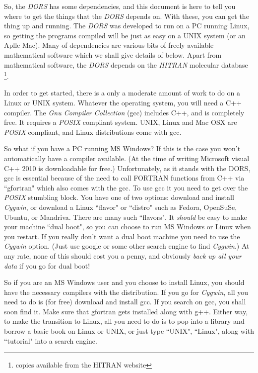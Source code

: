 \documentclass[12pt]{article}
\begin{document}
 So, the {\it DORS} has some dependencies, and this document is here to tell you
where to get the things that the {\it DORS} depends on. With these, you can get the thing up and running.
The {\it DORS} was developed to run on a PC running Linux, so getting the programs compiled
will be just as easy on a UNIX system (or an Aplle Mac). Many of  dependencies are  various bits of freely
available mathematical software which we shall give details of below. Apart from mathematical
software, the {\it DORS}
 depends on the {\it HITRAN}
molecular database \cite{RothmanETAL:Mybib} \cite{RothmanETAL96:Mybib} \cite{RothmanETAL08:Mybib} \footnote{copies available from the HITRAN website}.

 In order to get started, there is a only a moderate
amount of work to do on a Linux or UNIX system. Whatever the operating system, you will need a C++ compiler.
The {\it Gnu Compiler Collection} (gcc) includes C++, and is  completely free. It requires a {\it POSIX} compliant system. UNIX, 
Linux and Mac OSX are { \it POSIX }compliant, and Linux distributions come with gcc. 

 So what if you have
a PC running MS Windows? 
If this is the
case you won't automatically have a compiler available. (At the time of writing Microsoft visual C++ 2010 is
 downloadable for free.) Unfortunately, as it stands with the DORS, gcc is essential because of the need to
call FORTRAN functions from C++ via ``gfortran" which also comes with the gcc. To use gcc it you need 
to get over the {\it POSIX} stumbling block. 
You have one of two options: download and install {\it Cygwin}, or download a Linux ``flavor" or ``distro" 
 such as Fedora, OpenSuSe, Ubuntu, or Mandriva. There are many such ``flavors". It {\it should} be easy to make
your machine ``dual boot", so you can choose to run MS Windows or Linux when you restart.
If you  really don't want a dual boot machine you need to use the {\it Cygwin} option. (Just use google or some other search engine
to find {\it Cygwin}.) At any rate, none of this should cost you a penny, and obviously {\it back up all
your data } if you go for dual boot! 


So if you are an MS Windows user  and you choose to install Linux, you should have the necessary compilers
with the distribution. If you
go for {\it Cygwin}, all
you need to do is (for free) download and install gcc.
If you search on gcc, you shall soon find it. Make sure that gfortran gets installed
along with g++. 
Either way, to make the transition to Linux, all you need to do is to pop into a library and borrow a basic book on Linux
 or UNIX, or just type ``UNIX", ``Linux", along with  ``tutorial" into a search engine.
\end{document}

